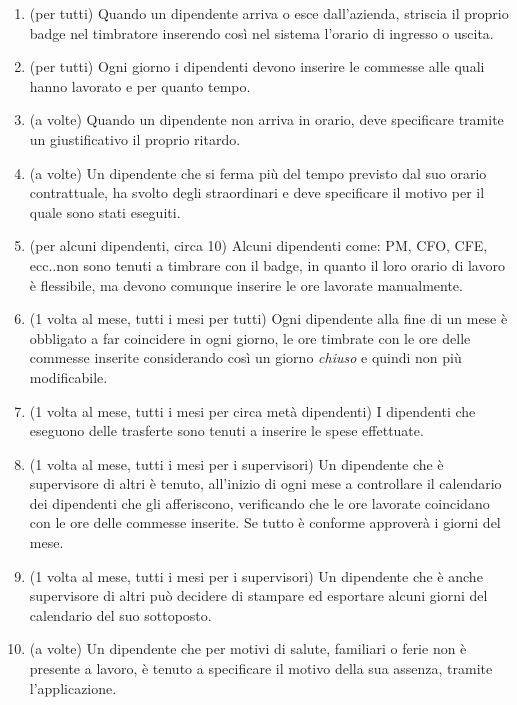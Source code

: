 \documentclass[12pt]{report}
\begin{document}
\begin{enumerate}
	\item (per tutti) Quando un dipendente arriva o esce dall'azienda, striscia il proprio badge nel timbratore inserendo così nel sistema l'orario di ingresso o uscita.
	\item (per tutti) Ogni giorno i dipendenti devono inserire le commesse alle quali hanno lavorato e per quanto tempo.
	\item (a volte) Quando un dipendente non arriva in orario, deve specificare tramite un giustificativo il proprio ritardo.
	\item (a volte) Un dipendente che si ferma più del tempo previsto dal suo orario contrattuale, ha svolto degli straordinari e deve specificare il motivo per il quale sono stati eseguiti.
	\item(per alcuni dipendenti, circa 10)
	Alcuni dipendenti come: PM, CFO, CFE, ecc..non sono tenuti a timbrare con il badge, in quanto il loro orario di lavoro è flessibile, ma devono comunque inserire le ore lavorate manualmente.
	\item (1 volta al mese, tutti i mesi per tutti) Ogni dipendente alla fine di un mese è obbligato a far coincidere in ogni giorno, le ore timbrate con le ore delle commesse inserite considerando così un giorno \textit{chiuso} e quindi non più modificabile.
	\item (1 volta al mese, tutti i mesi per circa metà dipendenti) I dipendenti che eseguono delle trasferte sono tenuti a inserire le spese effettuate.
	\item (1 volta al mese, tutti i mesi per i supervisori) Un dipendente che è supervisore di altri è tenuto, all'inizio di ogni mese a controllare il calendario dei dipendenti che gli afferiscono, verificando che le ore lavorate coincidano con le ore delle commesse inserite. Se tutto è conforme approverà i giorni del mese.
	\item (1 volta al mese, tutti i mesi per i supervisori) Un dipendente che è anche supervisore di altri può decidere di stampare ed esportare alcuni giorni del calendario del suo sottoposto.
	\item (a volte) Un dipendente che per motivi di salute, familiari o ferie non è presente a lavoro, è tenuto a specificare il motivo della sua assenza, tramite l'applicazione.

\end{enumerate}
\end{document}
